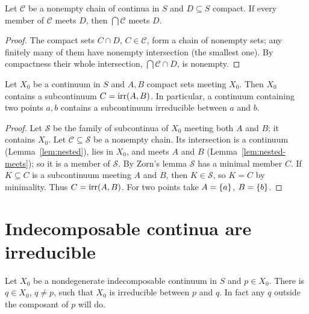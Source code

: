 \begin{lemma}\label{lem:nested-meets}
Let $\mathcal C$ be a nonempty chain of continua in $S$ and $D\subseteq S$ compact. If every member
of $\mathcal C$ meets $D$, then $\bigcap\mathcal C$ meets $D$.
\end{lemma}

\begin{proof}
The compact sets $C\cap D$, $C\in\mathcal C$, form a chain of nonempty sets; any finitely many of
them have nonempty intersection (the smallest one). By compactness their whole intersection,
$\bigcap\mathcal C\cap D$, is nonempty.
\end{proof}

\begin{theorem}\label{thm:irr-exists}
Let $X_0$ be a continuum in $S$ and $A,B$ compact sets meeting $X_0$. Then $X_0$ contains a
subcontinuum $C=\operatorname{irr}(A,B)$. In particular, a continuum containing two points $a,b$ contains a
subcontinuum irreducible between $a$ and $b$.
\end{theorem}

\begin{proof}
Let $\mathcal S$ be the family of subcontinua of $X_0$ meeting both $A$ and $B$; it contains $X_0$.
Let $\mathcal C\subseteq\mathcal S$ be a nonempty chain. Its intersection is a continuum
(Lemma~\ref{lem:nested}), lies in $X_0$, and meets $A$ and $B$ (Lemma~\ref{lem:nested-meets}); so
it is a member of $\mathcal S$. By Zorn's lemma $\mathcal S$ has a minimal member $C$. If $K\subseteq
C$ is a subcontinuum meeting $A$ and $B$, then $K\in\mathcal S$, so $K=C$ by minimality. Thus
$C=\operatorname{irr}(A,B)$. For two points take $A=\left\{ a \right\}$, $B=\left\{ b \right\}$.
\end{proof}


\section{Indecomposable continua are irreducible}

\begin{theorem}\label{thm:indec-irr}
Let $X_0$ be a nondegenerate indecomposable continuum in $S$ and $p\in X_0$. There is $q\in X_0$,
$q\neq p$, such that $X_0$ is irreducible between $p$ and $q$. In fact any $q$ outside the composant
of $p$ will do.
\end{theorem}

